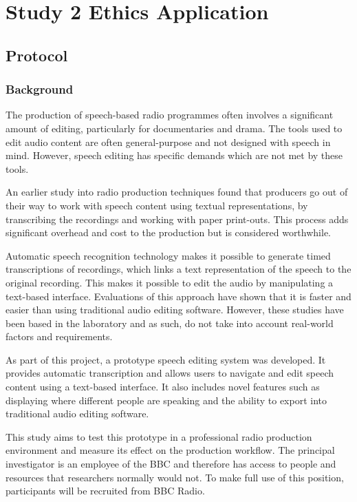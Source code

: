 \chapter{Study 2 Ethics Application}

\section{Protocol}
\subsection{Background}
The production of speech-based radio programmes often involves a significant
amount of editing, particularly for documentaries and drama. The tools used to
edit audio content are often general-purpose and not designed with speech in
mind. However, speech editing has specific demands which are not met by these
tools.

An earlier study into radio production techniques \cite{Baume2015} found that
producers go out of their way to work with speech content using textual
representations, by transcribing the recordings and working with paper
print-outs. This process adds significant overhead and cost to the production
but is considered worthwhile.

Automatic speech recognition technology makes it possible to generate timed
transcriptions of recordings, which links a text representation of the speech
to the original recording. This makes it possible to edit the audio by
manipulating a text-based interface. Evaluations of this approach
\cite{Whittaker2004, Rubin2013} have shown that it is faster and easier than
using traditional audio editing software. However, these studies have been
based in the laboratory and as such, do not take into account real-world
factors and requirements.

As part of this project, a prototype speech editing system was developed. It
provides automatic transcription and allows users to navigate and edit speech
content using a text-based interface. It also includes novel features such as
displaying where different people are speaking and the ability to export into
traditional audio editing software.

This study aims to test this prototype in a professional radio production
environment and measure its effect on the production workflow. The principal
investigator is an employee of the BBC and therefore has access to people and
resources that researchers normally would not. To make full use of this
position, participants will be recruited from BBC Radio.


